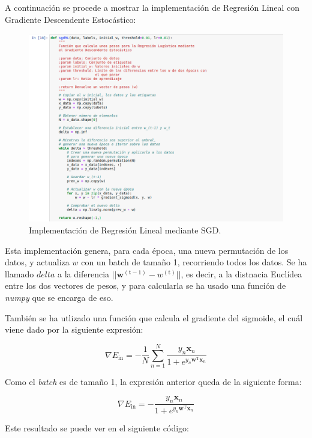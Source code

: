 \documentclass[11pt,a4paper]{article}
\begin{document}
A continuación se procede a mostrar la implementación de Regresión Lineal con Gradiente Descendente
Estocástico:

\begin{figure}[H]
\centering
\includegraphics[scale=0.4]{img/sgdRL.png}
\caption{Implementación de Regresión Lineal mediante SGD.}
\end{figure}

Esta implementación genera, para cada época, una nueva permutación de los datos, y actualiza $w$ con
un batch de tamaño 1, recorriendo todos los datos. Se ha llamado $delta$ a la diferencia
$||\mathbf{w}^{(\text{t}-1)} - w^{(\text{t})} ||$, es decir, a la distnacia Euclídea entre los
dos vectores de pesos, y para calcularla se ha usado una función de \textit{numpy} que se encarga
de eso.

También se ha utlizado una función que calcula el gradiente del sigmoide, el cuál viene dado por la
siguiente expresión:

\begin{equation}
	\nabla E_{\text{in}} = - \frac{1}{N}
	\sum_{n = 1}^N \frac{y_n\mathbf{x}_n}{1 + e^{y_n\mathbf{w}^{\text{T}}\mathbf{x}_n}}
\end{equation}

Como el \textit{batch} es de tamaño 1, la expresión anterior queda de la siguiente forma:

\begin{equation}
	\nabla E_{\text{in}} = - \frac{y_n\mathbf{x}_n}{1 + e^{y_n\mathbf{w}^{\text{T}}\mathbf{x}_n}}
\end{equation}

Este resultado se puede ver en el siguiente código:
\end{document}
